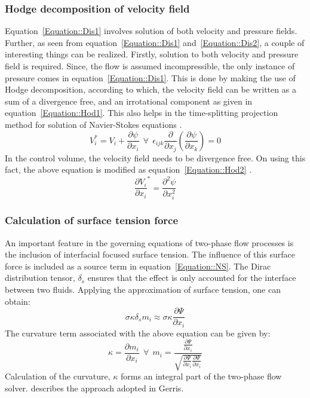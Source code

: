 \subsubsection{Hodge decomposition of velocity field}
Equation~\ref{Equation::Dis1} involves solution of both velocity and pressure fields. Further, as seen from equation~\ref{Equation::Dis1} and~\ref{Equation::Dis2}, a couple of interesting things can be realized. Firstly, solution to both velocity and pressure field is required. Since, the flow is assumed incompressible, the only instance of pressure comes in equation~\ref{Equation::Dis1}. This is done by making the use of Hodge decomposition, according to which, the velocity field can be written as a sum of a divergence free, and an irrotational component as given in equation~\ref{Equation::Hod1}. This also helps in the time-splitting projection method for solution of Navier-Stokes equations \citep{Chorin1968}.
\begin{equation}\label{Equation::Hod1}
V_i^* = V_i + \frac{\partial\psi}{\partial x_i}\:\:\forall\:\:\epsilon_{ijk}\frac{\partial}{\partial x_j}\left(\frac{\partial\psi}{\partial x_k}\right) = 0
\end{equation}
In the control volume, the velocity field needs to be divergence free. On using this fact, the above equation is modified as equation~\ref{Equation::Hod2} \citep{popinet2009}. 
\begin{equation}\label{Equation::Hod2}
\frac{\partial V_i}{\partial x_i}^* = \frac{\partial^2\psi}{\partial x_i^2}
\end{equation}
\subsubsection{Calculation of surface tension force}\label{Section::sigma}
An important feature in the governing equations of two-phase flow processes is the inclusion of interfacial focused surface tension. The influence of this surface force is included as a source term in equation~\ref{Equation::NS}. The Dirac distribution tensor, $\delta_s$ ensures that the effect is only accounted for the interface between two fluids. Applying the \citet{brackbill1992continuum} approximation of surface tension, one can obtain:
\begin{equation}\label{Equation::sigma1}
\sigma\kappa\delta_sm_i \approx \sigma\kappa\frac{\partial\Psi}{\partial x_i} 
\end{equation}
The curvature term associated with the above equation can be given by:
\begin{equation}\label{Equation::sigma2}
\kappa = \frac{\partial m_i}{\partial x_i}\:\:\forall\:\:m_i = \frac{\frac{\partial\Psi}{\partial x_i}}{\sqrt{\frac{\partial\Psi}{\partial x_i}\frac{\partial\Psi}{\partial x_i}}}
\end{equation}
Calculation of the curvature, $\kappa$ forms an integral part of the two-phase flow solver. \citet{popinet2009} describes the approach adopted in Gerris.
